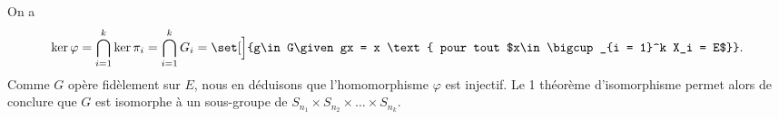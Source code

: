 On a
\[
  \ker \varphi = \bigcap_{i = 1}^k \ker \pi_i
               = \bigcap_{i = 1}^k G_i = \set[\Big]{g\in G\given gx
               = x \text{ pour tout $x\in\bigcup_{i = 1}^k X_i = E$}}.
\]
Comme $G$ opère fidèlement sur $E$, nous en déduisons que l'homomorphisme $\varphi$ est injectif.
Le 1\ier{} théorème d'isomorphisme permet alors de conclure que $G$ est isomorphe à un sous-groupe de $S_{n_1}\times S_{n_2}\times\dots\times S_{n_k}$.
